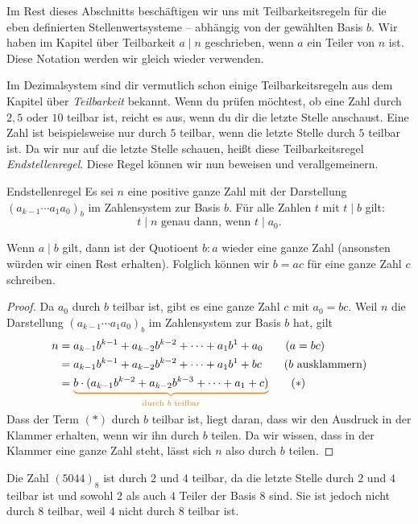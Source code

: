 \documentclass[../../main.tex]{subfiles}
\begin{document}
Im Rest dieses Abschnitts beschäftigen wir uns mit Teilbarkeitsregeln für die eben definierten Stellenwertsysteme -- abhängig von der gewählten Basis $b$. Wir haben im Kapitel über Teilbarkeit $a\mid n$ geschrieben, wenn $a$ ein Teiler von $n$ ist. Diese Notation werden wir gleich wieder verwenden.

Im Dezimalsystem sind dir vermutlich schon einige Teilbarkeitsregeln aus dem Kapitel über \mayberef\emph{Teilbarkeit} bekannt. Wenn du prüfen möchtest, ob eine Zahl durch $2, 5$ oder $10$ teilbar ist, reicht es aus, wenn du dir die letzte Stelle anschaust. Eine Zahl ist beispielsweise nur durch $5$ teilbar, wenn die letzte Stelle durch $5$ teilbar ist. Da wir nur auf die letzte Stelle schauen, heißt diese Teilbarkeitsregel \emph{Endstellenregel}. Diese Regel können wir nun beweisen und verallgemeinern.
\begin{theorem}{Endstellenregel}
    Es sei $n$ eine positive ganze Zahl mit der Darstellung $(a_{k-1}\cdots a_1a_0)_b$ im Zahlensystem zur Basis $b$. Für alle Zahlen $t$ mit $t\mid b$ gilt:
    \[t\mid n\text{ genau dann, wenn }t\mid a_0.\]
\end{theorem}
Wenn $a\mid b$ gilt, dann ist der Quotioent $b:a$ wieder eine ganze Zahl (ansonsten würden wir einen Rest erhalten). Folglich können wir $b=ac$ für eine ganze Zahl $c$ schreiben. 
\begin{proof}
    Da $a_0$ durch $b$ teilbar ist, gibt es eine ganze Zahl $c$ mit $a_0=bc$. Weil $n$ die Darstellung $(a_{k-1}\cdots a_1a_0)_b$ im Zahlensystem zur Basis $b$ hat, gilt
    \begin{align*}
        n&=a_{k-1}b^{k-1}+a_{k-2}b^{k-2}+\dots+a_1b^1+a_0\tag{$a=bc$}\\
        &=a_{k-1}b^{k-1}+a_{k-2}b^{k-2}+\dots+a_1b^1+bc\tag{$b$ ausklammern}\\
        &=\colorbrace{b\cdot(a_{k-1}b^{k-2}+a_{k-2}b^{k-3}+\dots+a_1+c)}{\text{durch }b\text{ teilbar}}\tag{$*$}
    \end{align*}
    Dass der Term $(*)$ durch $b$ teilbar ist, liegt daran, dass wir den Ausdruck in der Klammer erhalten, wenn wir ihn durch $b$ teilen. Da wir wissen, dass in der Klammer eine ganze Zahl steht, lässt sich $n$ also durch $b$ teilen.
\end{proof}
\begin{advexample}{}
    Die Zahl $(5044)_8$ ist durch $2$ und $4$ teilbar, da die letzte Stelle durch $2$ und $4$ teilbar ist und sowohl $2$ als auch $4$ Teiler der Basis $8$ sind. Sie ist jedoch nicht durch $8$ teilbar, weil $4$ nicht durch $8$ teilbar ist.
\end{advexample}
\end{document}
